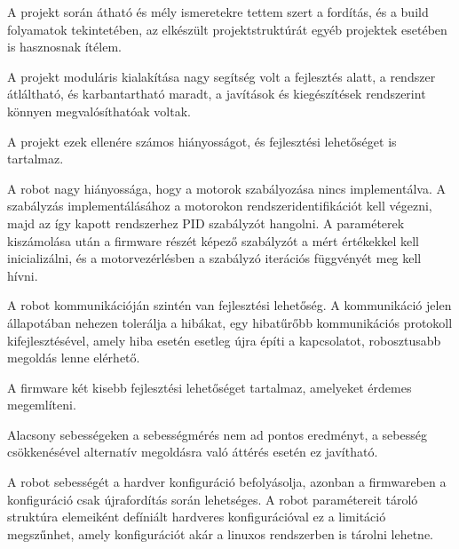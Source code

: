 A projekt során átható és mély ismeretekre tettem szert a fordítás, és a build
folyamatok tekintetében, az elkészült projektstruktúrát egyéb projektek
esetében is hasznosnak ítélem.  

A projekt moduláris kialakítása nagy segítség volt a fejlesztés alatt, a rendszer
átláltható, és karbantartható maradt, a javítások és kiegészítések rendszerint
könnyen megvalósíthatóak voltak.

\medskip

A projekt ezek ellenére számos hiányosságot, és fejlesztési lehetőséget is
tartalmaz. 

A robot nagy hiányossága, hogy a motorok szabályozása nincs implementálva. A
szabályzás implementálásához a motorokon rendszeridentifikációt kell végezni,
majd az így kapott rendszerhez PID szabályzót hangolni. A paraméterek kiszámolása
után a firmware részét képező szabályzót a mért értékekkel kell inicializálni, és
a motorvezérlésben a szabályzó iterációs függvényét meg kell hívni.

\medskip

A robot kommunikációján szintén van fejlesztési lehetőség. A kommunikáció jelen
állapotában nehezen tolerálja a hibákat, egy hibatűrőbb kommunikációs protokoll
kifejlesztésével, amely hiba esetén esetleg újra építi a kapcsolatot,
robosztusabb megoldás lenne elérhető. 

\medskip

A firmware két kisebb fejlesztési lehetőséget tartalmaz, amelyeket érdemes
megemlíteni.

Alacsony sebességeken a sebességmérés nem ad pontos eredményt, a
sebesség csökkenésével alternatív megoldásra való áttérés esetén ez javítható.

A robot sebességét a hardver konfiguráció befolyásolja, azonban a firmwareben a
konfiguráció csak újrafordítás során lehetséges. A robot paramétereit tároló
struktúra elemeiként defíniált hardveres konfigurációval ez a limitáció
megszűnhet, amely konfigurációt akár a linuxos rendszerben is tárolni lehetne.

